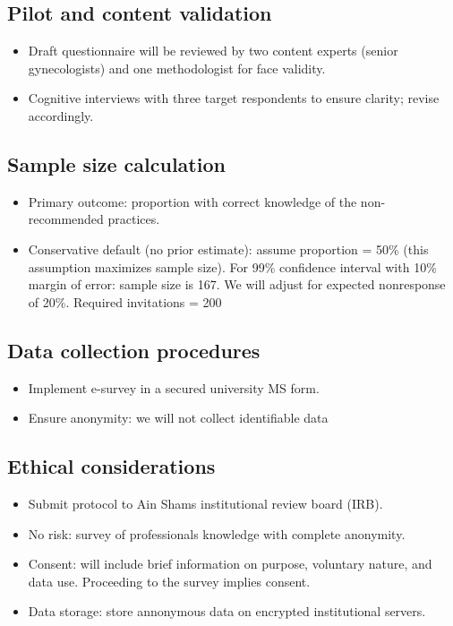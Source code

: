 \documentclass[
  letterpaper,
  DIV=11,
  numbers=noendperiod]{scrartcl}
\begin{document}
\subsection{Pilot and content
validation}\label{pilot-and-content-validation}

\begin{itemize}
\item
  Draft questionnaire will be reviewed by two content experts (senior
  gynecologists) and one methodologist for face validity.
\item
  Cognitive interviews with three target respondents to ensure clarity;
  revise accordingly.
\end{itemize}

\subsection{Sample size calculation}\label{sample-size-calculation}

\begin{itemize}
\item
  Primary outcome: proportion with correct knowledge of the
  non-recommended practices.
\item
  Conservative default (no prior estimate): assume proportion = 50\%
  (this assumption maximizes sample size). For 99\% confidence interval
  with 10\% margin of error: sample size is 167. We will adjust for
  expected nonresponse of 20\%. Required invitations = 200
\end{itemize}

\subsection{Data collection
procedures}\label{data-collection-procedures}

\begin{itemize}
\item
  Implement e-survey in a secured university MS form.
\item
  Ensure anonymity: we will not collect identifiable data
\end{itemize}

\subsection{Ethical considerations}\label{ethical-considerations}

\begin{itemize}
\item
  Submit protocol to Ain Shams institutional review board (IRB).
\item
  No risk: survey of professionals knowledge with complete anonymity.
\item
  Consent: will include brief information on purpose, voluntary nature,
  and data use. Proceeding to the survey implies consent.
\item
  Data storage: store annonymous data on encrypted institutional
  servers.
\end{itemize}
\end{document}
